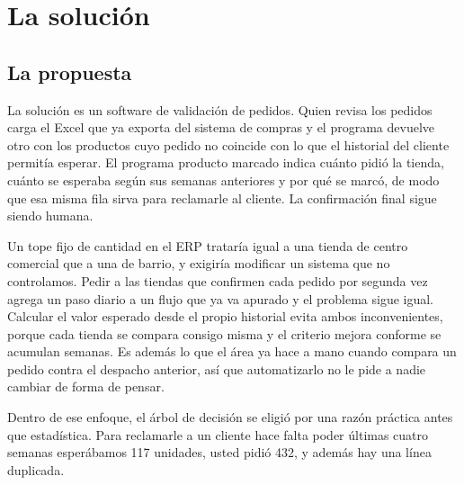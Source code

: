 \section{La solución}

\subsection{La propuesta}

La solución es un software de validación de pedidos. Quien revisa los pedidos carga el Excel que ya exporta del sistema de compras y el programa devuelve otro con los productos cuyo pedido no coincide con lo que el historial del cliente permitía esperar.  El programa  producto marcado indica cuánto pidió la tienda, cuánto se esperaba según sus semanas anteriores y por qué se marcó, de modo que esa misma fila sirva para reclamarle al cliente. La confirmación final sigue siendo humana.

 Un tope fijo de cantidad en el ERP trataría igual a una tienda de centro comercial que a una de barrio, y exigiría modificar un sistema que no controlamos. Pedir a las tiendas que confirmen cada pedido por segunda vez agrega un paso diario a un flujo que ya va apurado y  el problema sigue igual. Calcular el valor esperado desde el propio historial evita ambos inconvenientes, porque cada tienda se compara consigo misma y el criterio mejora conforme se acumulan semanas. Es además lo que el área ya hace a mano cuando compara un pedido contra el despacho anterior, así que automatizarlo no le pide a nadie cambiar de forma de pensar.

Dentro de ese enfoque, el árbol de decisión \cite{breiman1984,quinlan1993} se eligió por una razón práctica antes que estadística. Para reclamarle a un cliente hace falta poder  últimas cuatro semanas esperábamos 117 unidades, usted pidió 432, y además hay una línea duplicada. 

